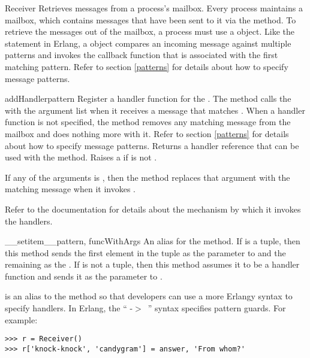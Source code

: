 \documentclass{howto}
\newcommand{\greaterthan}[0]{\begin{math}>\end{math}}
\newcommand{\greaterthan}[0]{>}
\begin{document}
\begin{classdesc}{Receiver}{}
Retrieves messages from a process's mailbox. Every process maintains a mailbox,
which contains messages that have been sent to it via the 
method. To retrieve the messages out of the mailbox, a process must use a
 object. Like the  statement in Erlang, a
 object compares an incoming message against multiple patterns
and invokes the callback function that is associated with the first matching
pattern. Refer to section \ref{patterns} for details about how to specify
message patterns.

\begin{methoddesc}{addHandler}{pattern}
Register a handler function  for the . The
 method calls the  with the  argument
list when it receives a message that matches . When a handler
function  is not specified, the  method removes any
matching message from the mailbox and does nothing more with it. Refer to
section \ref{patterns} for details about how to specify message patterns.
Returns a handler reference that can be used with the 
method. Raises a   if  is not
.

If any of the  arguments is , then the
 method replaces that argument with the matching message when
it invokes .

Refer to the  documentation for details about the
mechanism by which it invokes the handlers.
\end{methoddesc}

\begin{methoddesc}{__setitem__}{pattern, funcWithArgs}
\opindex{[]}
An alias for the  method. If  is a tuple,
then this method sends the first element in the tuple as the 
parameter to  and the remaining as the . If
 is not a tuple, then this method assumes it to be a handler
function and sends it as the  parameter to .

 is an alias to the  method so that
developers can use a more Erlangy syntax to specify handlers. In Erlang, the
`` -\greaterthan\ '' syntax specifies pattern guards. For
example:
\begin{verbatim}
>>> r = Receiver()
>>> r['knock-knock', 'candygram'] = answer, 'From whom?'
\end{verbatim}
\end{methoddesc}


\end{classdesc}
\end{document}
